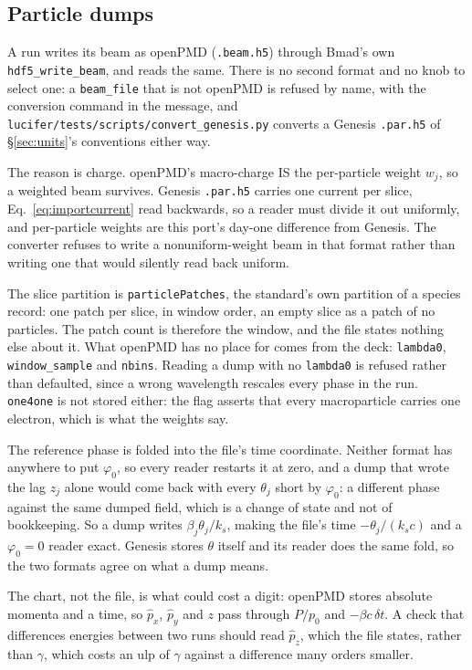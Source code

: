 \documentclass[11pt]{article}
\newcommand{\code}[1]{\texttt{#1}}
\begin{document}
\subsection{Particle dumps}\label{sec:pardump}

A run writes its beam as openPMD (\code{.beam.h5}) through Bmad's own
\code{hdf5\_write\_beam}, and reads the same. There is no second format and no knob to
select one: a \code{beam\_file} that is not openPMD is refused by name, with the
conversion command in the message, and
\code{lucifer/tests/scripts/convert\_genesis.py} converts a Genesis \code{.par.h5} of
\S\ref{sec:units}'s conventions either way.

The reason is charge. openPMD's macro-charge IS the per-particle weight $w_j$, so a
weighted beam survives. Genesis \code{.par.h5} carries one current per slice,
Eq.~\ref{eq:importcurrent} read backwards, so a reader must divide it out uniformly, and
per-particle weights are this port's day-one difference from Genesis. The converter
refuses to write a nonuniform-weight beam in that format rather than writing one that
would silently read back uniform.

The slice partition is \code{particlePatches}, the standard's own partition of a species
record: one patch per slice, in window order, an empty slice as a patch of no particles.
The patch count is therefore the window, and the file states nothing else about it. What
openPMD has no place for comes from the deck: \code{lambda0}, \code{window\_sample} and
\code{nbins}. Reading a dump with no \code{lambda0} is refused rather than defaulted,
since a wrong wavelength rescales every phase in the run. \code{one4one} is not stored
either: the flag asserts that every macroparticle carries one electron, which is what the
weights say.

The reference phase is folded into the file's time coordinate. Neither format has
anywhere to put $\varphi_0$, so every reader restarts it at zero, and a dump that wrote
the lag $z_j$ alone would come back with every $\theta_j$ short by $\varphi_0$: a
different phase against the same dumped field, which is a change of state and not of
bookkeeping. So a dump writes $\beta_j \theta_j / k_s$, making the file's time
$-\theta_j/(k_s c)$ and a $\varphi_0 = 0$ reader exact. Genesis stores $\theta$ itself and
its reader does the same fold, so the two formats agree on what a dump means.

The chart, not the file, is what could cost a digit: openPMD stores absolute momenta and
a time, so $\hat p_x$, $\hat p_y$ and $z$ pass through $P/p_0$ and
$-\beta c\,\delta t$. A check that differences energies between two runs should read
$\hat p_z$, which the file states, rather than $\gamma$, which costs an ulp of $\gamma$
against a difference many orders smaller.
\end{document}
